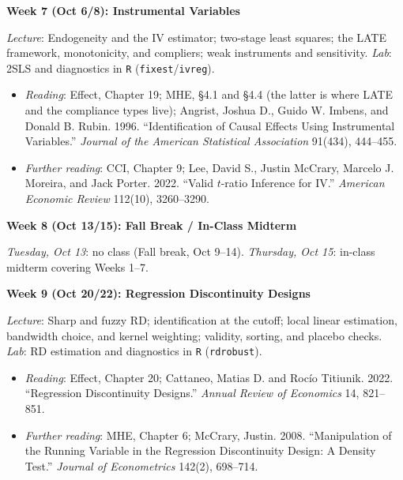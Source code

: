 \documentclass[12pt]{article}
\begin{document}
\vspace{0.8em} \noindent \textbf{\textcolor{titlecolor}{Week 7 (Oct 6/8): Instrumental Variables}}

\noindent \textit{Lecture}: Endogeneity and the IV estimator; two-stage least squares; the LATE framework, monotonicity, and compliers; weak instruments and sensitivity. \textit{Lab}: 2SLS and diagnostics in \texttt{R} (\texttt{fixest}/\texttt{ivreg}).
\begin{itemize}[noitemsep, topsep=2pt]
    \item \textit{Reading}: Effect, Chapter 19; MHE, \S 4.1 and \S 4.4 (the latter is where LATE and the compliance types live); Angrist, Joshua D., Guido W. Imbens, and Donald B. Rubin. 1996. ``Identification of Causal Effects Using Instrumental Variables.'' \textit{Journal of the American Statistical Association} 91(434), 444--455.
    \item \textit{Further reading}: CCI, Chapter 9; Lee, David S., Justin McCrary, Marcelo J. Moreira, and Jack Porter. 2022. ``Valid $t$-ratio Inference for IV.'' \textit{American Economic Review} 112(10), 3260--3290.
\end{itemize}

\vspace{0.8em} \noindent \textbf{\textcolor{titlecolor}{Week 8 (Oct 13/15): Fall Break / In-Class Midterm}}

\noindent \textit{Tuesday, Oct 13}: no class (Fall break, Oct 9--14). \textit{Thursday, Oct 15}: in-class midterm covering Weeks 1--7.

\vspace{0.8em} \noindent \textbf{\textcolor{titlecolor}{Week 9 (Oct 20/22): Regression Discontinuity Designs}}

\noindent \textit{Lecture}: Sharp and fuzzy RD; identification at the cutoff; local linear estimation, bandwidth choice, and kernel weighting; validity, sorting, and placebo checks. \textit{Lab}: RD estimation and diagnostics in \texttt{R} (\texttt{rdrobust}).
\begin{itemize}[noitemsep, topsep=2pt]
    \item \textit{Reading}: Effect, Chapter 20; Cattaneo, Matias D. and Roc\'{i}o Titiunik. 2022. ``Regression Discontinuity Designs.'' \textit{Annual Review of Economics} 14, 821--851.
    \item \textit{Further reading}: MHE, Chapter 6; McCrary, Justin. 2008. ``Manipulation of the Running Variable in the Regression Discontinuity Design: A Density Test.'' \textit{Journal of Econometrics} 142(2), 698--714.
\end{itemize}
\end{document}
